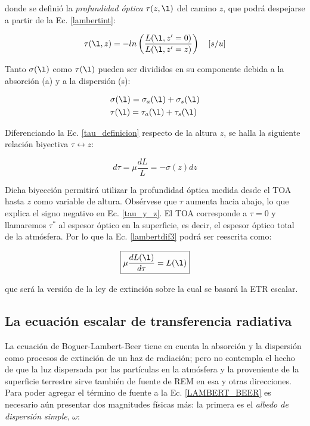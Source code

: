 donde se definió la \textit{profundidad óptica} $\tau(z,\l)$ del camino $z$, que podrá despejarse a partir de la Ec. \eqref{lambertint}:

\begin{equation}
\tau(\l,z)=-ln \left( \frac{L(\l,z'=0)}{L(\l,z'=z)} \right) \quad [s/u]
\label{tau_definicion}
\end{equation}

Tanto $\sigma(\l)$ como $\tau(\l)$ pueden ser divididos en su componente debida a la absorción (a) y a la dispersión (s):

\begin{align}
 &\sigma(\l)=\sigma_{a}(\l)+\sigma_{s}(\l)\\
 &\tau(\l)=\tau_{a}(\l)+\tau_{s}(\l)
\label{abs+sca}
 \end{align}

Diferenciando la Ec. \eqref{tau_definicion} respecto de la altura $z$, se halla la siguiente relación biyectiva $\tau\leftrightarrow z$:

\begin{equation}
d\tau=\mu \frac{dL}{L}=-\sigma(z) dz
\label{tau_y_z}
\end{equation}

Dicha biyección permitirá utilizar la profundidad óptica medida desde el TOA hasta $z$ como variable de altura. Obsérvese que $\tau$ aumenta hacia abajo, lo que explica el signo negativo en Ec. \eqref{tau_y_z}. El TOA corresponde a $\tau=0$ y llamaremos $\tau^{*}$ al espesor óptico en la superficie, es decir, el espesor óptico total de la atmósfera. Por lo que la Ec. \eqref{lambertdif3} podrá ser reescrita como:

\begin{equation}
\boxed{\mu \frac{d L(\l)}{d\tau}=L(\l)}
\label{LAMBERT_BEER}
\end{equation}

que será la versión de la ley de extinción sobre la cual se basará la ETR escalar.

\subsection{La ecuación escalar de transferencia radiativa}
\label{ch:marcofisico:EETR}

La ecuación de Boguer-Lambert-Beer tiene en cuenta la absorción y la dispersión como procesos de extinción de un haz de radiación; pero no contempla el hecho de que la luz dispersada por las partículas en la atmósfera y la proveniente de la superficie terrestre sirve también de fuente de REM en esa y otras direcciones. Para poder agregar el término de fuente a la Ec. \eqref{LAMBERT_BEER} es necesario aún presentar dos magnitudes físicas más: la primera es el \textit{albedo de dispersión simple}, $\omega$: 


